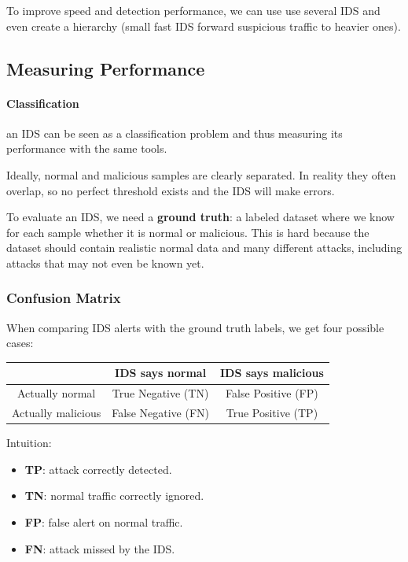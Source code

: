 To improve speed and detection performance, we can use use several IDS and even create a hierarchy (small fast IDS forward suspicious traffic to heavier ones).

\subsection{Measuring Performance}
\paragraph{Classification} an IDS can be seen as a classification problem and thus measuring its performance with the same tools.

Ideally, normal and malicious samples are clearly separated. In reality they often overlap, so no perfect threshold exists and the IDS will make errors.

To evaluate an IDS, we need a \textbf{ground truth}: a labeled dataset where we know for each sample whether it is normal or malicious. This is hard because the dataset should contain realistic normal data and many different attacks, including attacks that may not even be known yet.

\subsubsection{Confusion Matrix}

When comparing IDS alerts with the ground truth labels, we get four possible cases:

\begin{center}
\begin{tabular}{c|c|c}
 & IDS says normal & IDS says malicious \\
\hline
Actually normal & True Negative (TN) & False Positive (FP) \\
Actually malicious & False Negative (FN) & True Positive (TP) \\
\end{tabular}
\end{center}

Intuition:
\begin{itemize}
    \item \textbf{TP}: attack correctly detected.
    \item \textbf{TN}: normal traffic correctly ignored.
    \item \textbf{FP}: false alert on normal traffic.
    \item \textbf{FN}: attack missed by the IDS.
\end{itemize}

